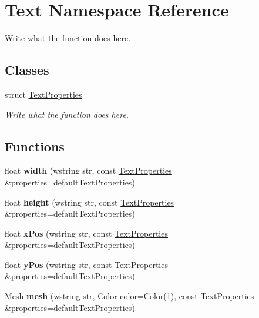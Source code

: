 \hypertarget{namespaceText}{\section{Text Namespace Reference}
\label{namespaceText}
}


Write what the function does here.  


\subsection*{Classes}
\begin{DoxyCompactItemize}
\item 
struct \hyperlink{structText_1_1TextProperties}{Text\+Properties}
\begin{DoxyCompactList}\small\item\em Write what the function does here. \end{DoxyCompactList}\end{DoxyCompactItemize}
\subsection*{Functions}
\begin{DoxyCompactItemize}
\item 
\hypertarget{namespaceText_aafd9732eac58db439aa7e06944d7b225}{float {\bfseries width} (wstring str, const \hyperlink{structText_1_1TextProperties}{Text\+Properties} \&properties=default\+Text\+Properties)}\label{namespaceText_aafd9732eac58db439aa7e06944d7b225}

\item 
\hypertarget{namespaceText_aa880dedcd8818de828e9a6b43662ab09}{float {\bfseries height} (wstring str, const \hyperlink{structText_1_1TextProperties}{Text\+Properties} \&properties=default\+Text\+Properties)}\label{namespaceText_aa880dedcd8818de828e9a6b43662ab09}

\item 
\hypertarget{namespaceText_a29e181ab0f33bb1d94e8b3c1a99146ab}{float {\bfseries x\+Pos} (wstring str, const \hyperlink{structText_1_1TextProperties}{Text\+Properties} \&properties=default\+Text\+Properties)}\label{namespaceText_a29e181ab0f33bb1d94e8b3c1a99146ab}

\item 
\hypertarget{namespaceText_a0ee9706b02c6fdae4ac8e20d6e623ccc}{float {\bfseries y\+Pos} (wstring str, const \hyperlink{structText_1_1TextProperties}{Text\+Properties} \&properties=default\+Text\+Properties)}\label{namespaceText_a0ee9706b02c6fdae4ac8e20d6e623ccc}

\item 
\hypertarget{namespaceText_a3d2d5a9d5b9132df55075d493cc1d74f}{Mesh {\bfseries mesh} (wstring str, \hyperlink{structColor}{Color} color=\hyperlink{structColor}{Color}(1), const \hyperlink{structText_1_1TextProperties}{Text\+Properties} \&properties=default\+Text\+Properties)}\label{namespaceText_a3d2d5a9d5b9132df55075d493cc1d74f}

\end{DoxyCompactItemize}
